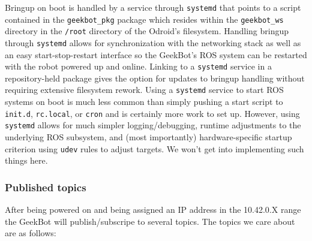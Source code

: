 Bringup on boot is handled by a service through \texttt{systemd} that
points to a script contained in the \texttt{geekbot\_pkg} package which
resides within the \texttt{geekbot\_ws} directory in the \texttt{/root}
directory of the Odroid's filesystem. Handling bringup through
\texttt{systemd} allows for synchronization with the networking stack as
well as an easy start-stop-restart interface so the GeekBot's ROS system
can be restarted with the robot powered up and online. Linking to a
\texttt{systemd} service in a repository-held package gives the option
for updates to bringup handling without requiring extensive filesystem
rework. Using a \texttt{systemd} service to start ROS systems on boot is
much less common than simply pushing a start script to \texttt{init.d},
\texttt{rc.local}, or \texttt{cron} and is certainly more work to set
up. However, using \texttt{systemd} allows for much simpler
logging/debugging, runtime adjustments to the underlying ROS subsystem,
and (most importantly) hardware-specific startup criterion using
\texttt{udev} rules to adjust targets. We won't get into implementing
such things here.

\hypertarget{published-topics}{%
\subsubsection{Published topics}\label{published-topics}}

After being powered on and being assigned an IP address in the 10.42.0.X
range the GeekBot will publish/subscripe to several topics. The topics
we care about are as follows:

